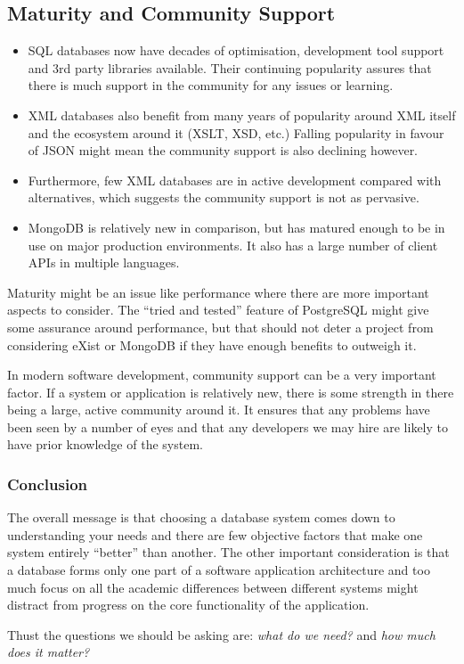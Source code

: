 \documentclass[11pt,a4paper]{article}
\begin{document}
\subsection{Maturity and Community Support}

\begin{itemize}
  \item SQL databases now have decades of optimisation, development tool
    support and 3rd party libraries available. Their continuing
    popularity assures that there is much support in the community for any
    issues or learning.
  \item XML databases also benefit from many years of popularity around
    XML itself and the ecosystem around it (XSLT, XSD, etc.) Falling popularity
    in favour of JSON might mean the community support is also declining however.
  \item Furthermore, few XML databases are in active development compared
    with alternatives, which suggests the community support is not as
    pervasive.
  \item MongoDB is relatively new in comparison, but has matured enough
    to be in use on major production environments. \cite{mongo-production} It
    also has a large number of client APIs in multiple languages.
\end{itemize}

Maturity might be an issue like performance where there are more important
aspects to consider. The ``tried and tested'' feature of PostgreSQL might
give some assurance around performance, but that should not deter a
project from considering eXist or MongoDB if they have enough benefits to
outweigh it.

In modern software development, community support can be a very important
factor. If a system or application is relatively new, there is some strength
in there being a large, active community around it. It ensures that
any problems have been seen by a number of eyes and that any developers
we may hire are likely to have prior knowledge of the system.

\subsubsection{Conclusion}

The overall message is that choosing a database system comes down to
understanding your needs and there are few objective factors that
make one system entirely ``better'' than another. The other important
consideration is that a database forms only one part of a software
application architecture and too much focus on all the academic
differences between different systems might distract from progress
on the core functionality of the application.

Thust the questions we should be asking are: \emph{what do we need?}
and \emph{how much does it matter?}



\end{document}

